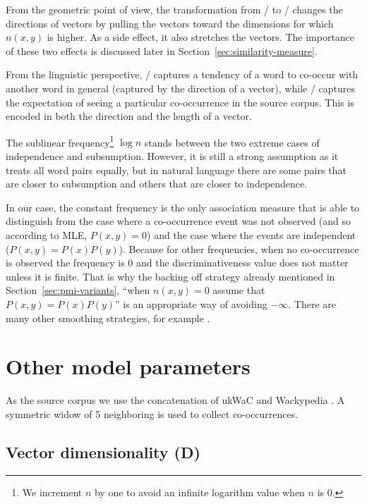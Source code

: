 From the geometric point of view, the transformation from \PMI/ to \NPMI/ changes the directions of vectors by pulling the vectors toward the dimensions for which $n(x, y)$ is higher. As a side effect, it also stretches the vectors. The importance of these two effects is discussed later in Section~\ref{sec:similarity-measure}.

From the linguistic perspective, \PMI/ captures a tendency of a word to co-occur with another word in general (captured by the direction of a vector), while \NPMI/ captures the expectation of seeing a particular co-occurrence in the source corpus. This is encoded in both the direction and the length of a vector.

The sublinear frequency\footnote{We increment $n$ by one to avoid an infinite logarithm value when $n$ is 0.} $\log n$ stands between the two extreme cases of independence and subsumption. However, it is still a strong assumption as it treats all word pairs equally, but in natural language there are some pairs that are closer to subsumption and others that are closer to independence.

In our case, the constant frequency is the only association measure that is able to distinguish from the case where a co-occurrence event was not observed (and so according to MLE, $P(x, y)= 0$) and the case where the events are independent ($P(x, y) = P(x)P(y)$). Because for other frequencies, when no co-occurrence is observed the frequency is 0 and the discriminativeness value does not matter unless it is finite. That is why the backing off strategy already mentioned in Section~\ref{sec:pmi-variants}, ``when $n(x, y) = 0$ assume that $P(x, y) = P(x)P(y)$'' is an appropriate way of avoiding $-\infty$. There are many other smoothing strategies, for example .

\section{Other model parameters}
\label{sec:other-model-paramt}



As the source corpus we use the concatenation of ukWaC and Wackypedia \cite{ukwac}.\footnotemark{} A symmetric widow of 5 neighboring is used to collect co-occurrences.


\subsection{Vector dimensionality (D)}
\label{sec:vect-dimens}

